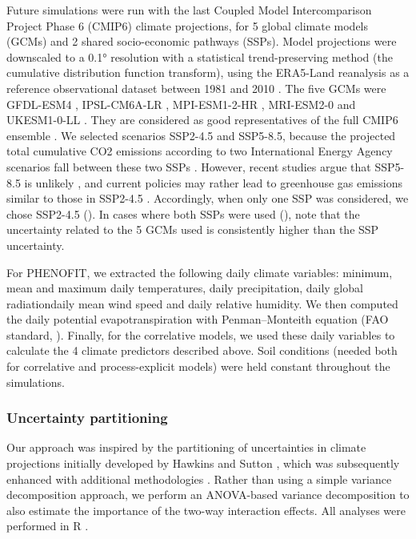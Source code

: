 \documentclass[letterpaper,8pt]{article}  %
\begin{document}
\begin{doublespacing}
\begin{linenumbers}
Future simulations were run with the last Coupled Model Intercomparison Project Phase 6 (CMIP6) climate  projections, for 5 global climate models (GCMs) and 2 shared socio-economic pathways (SSPs). 
Model projections were downscaled to a 0.1° resolution with a statistical trend-preserving method (the cumulative distribution function transform), using the ERA5-Land reanalysis as a reference observational dataset between 1981 and 2010 \citep{Noel2022}. The five GCMs were GFDL-ESM4 \citep{Dunne2020}, IPSL-CM6A-LR \citep{Lurton2020}, MPI-ESM1-2-HR \citep{Mueller2018}, MRI-ESM2-0 \citep{Yukimoto2019} and UKESM1-0-LL \citep{Sellar2020}. They are considered as good representatives of the full CMIP6 ensemble \citep{Noel2022}. We selected scenarios SSP2-4.5 and SSP5-8.5, because the projected total cumulative CO2 emissions according to two International Energy Agency scenarios fall between these two SSPs \citep{Schwalm2020}. However, recent studies argue that SSP5-8.5 is unlikely \citep{Hausfather2020}, and current policies may rather lead to greenhouse gas emissions similar to those in SSP2-4.5 \citep{Gillett2024}. Accordingly, when only one SSP was considered, we chose SSP2-4.5 (). In cases where both SSPs were used (), note that the uncertainty related to the 5 GCMs used is consistently higher than the SSP uncertainty.

For PHENOFIT, we extracted the following daily climate variables: minimum, mean and maximum daily temperatures, daily precipitation, daily global radiationdaily mean wind speed and daily relative humidity. We then computed the daily potential evapotranspiration with Penman–Monteith equation (FAO standard, \citealp{Allen1998}). Finally, for the correlative models, we used these daily variables to calculate the 4 climate predictors described above.  Soil conditions (needed both for correlative and process-explicit models) were held constant throughout the simulations.

\subsubsection{Uncertainty partitioning}

Our approach was inspired by the partitioning of uncertainties in climate projections initially developed by Hawkins and Sutton \citep{Hawkins2009, Hawkins2011}, which was subsequently enhanced with additional methodologies \citep[e.g.][]{Yip2011, Lafferty2023}. 
Rather than using a simple variance decomposition approach, we perform an ANOVA-based variance decomposition to also estimate the importance of the two-way interaction effects. All analyses were performed in R \citep{RCT2024}.


\end{linenumbers}
\end{doublespacing}
\end{document}
